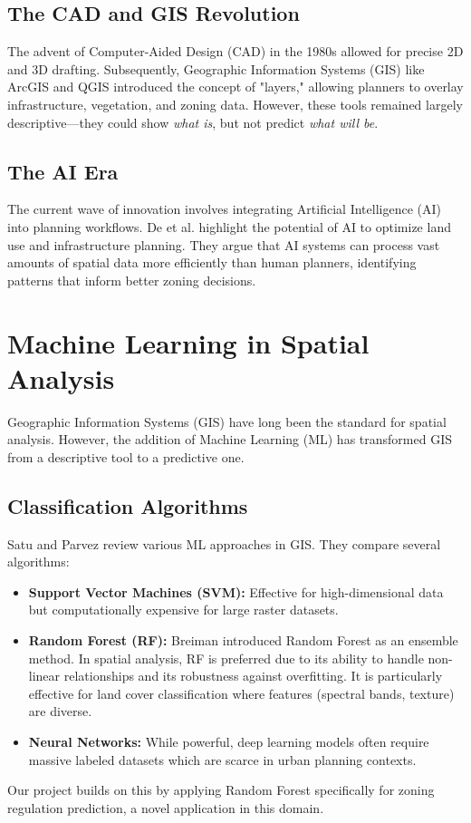 \documentclass[12pt,a4paper]{report}
\begin{document}
\subsection{The CAD and GIS Revolution}
The advent of Computer-Aided Design (CAD) in the 1980s allowed for precise 2D and 3D drafting. Subsequently, Geographic Information Systems (GIS) like ArcGIS and QGIS introduced the concept of "layers," allowing planners to overlay infrastructure, vegetation, and zoning data. However, these tools remained largely descriptive—they could show \textit{what is}, but not predict \textit{what will be}.

\subsection{The AI Era}
The current wave of innovation involves integrating Artificial Intelligence (AI) into planning workflows. De et al. \cite{de2013aiml} highlight the potential of AI to optimize land use and infrastructure planning. They argue that AI systems can process vast amounts of spatial data more efficiently than human planners, identifying patterns that inform better zoning decisions.

\section{Machine Learning in Spatial Analysis}
Geographic Information Systems (GIS) have long been the standard for spatial analysis. However, the addition of Machine Learning (ML) has transformed GIS from a descriptive tool to a predictive one. 

\subsection{Classification Algorithms}
Satu and Parvez \cite{satu2015review} review various ML approaches in GIS. They compare several algorithms:
\begin{itemize}
    \item \textbf{Support Vector Machines (SVM):} Effective for high-dimensional data but computationally expensive for large raster datasets.
    \item \textbf{Random Forest (RF):} Breiman \cite{breiman2001random} introduced Random Forest as an ensemble method. In spatial analysis, RF is preferred due to its ability to handle non-linear relationships and its robustness against overfitting. It is particularly effective for land cover classification where features (spectral bands, texture) are diverse.
    \item \textbf{Neural Networks:} While powerful, deep learning models often require massive labeled datasets which are scarce in urban planning contexts.
\end{itemize}
Our project builds on this by applying Random Forest specifically for zoning regulation prediction, a novel application in this domain.
\end{document}

